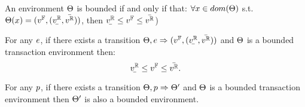 \documentclass[a4paper,11pt]{article}
\begin{document}
\clearpage
\begin{defn}
An environment $\Theta$ is bounded if and only if that:
$\forall x \in dom(\Theta)$ s.t. $\trsenv(x) =(\fval, (\ubar{\rval}, \bar{\rval}))$,
 then 
$\ubar{\rval} \leq \fval \leq \bar{\rval}$) 
\end{defn}
%
%
\begin{thm}
\label{thm:expsound}
For any $e$, if there exists a transition 
$\trsenv, \expr \trsto (\fval, (\ubar{\rval}, \bar{\rval}))$ 
and $\Theta$ is a bounded transaction environment
%
then:
%
$$\ubar{\rval} \leq \fval \leq \bar{\rval}.$$
%
\end{thm}
%
%
%
\begin{thm}
\label{thm:progsound}
For any $p$, if there exists a transition 
$\Theta, p \Rightarrow \Theta'$ and $\Theta$ is a bounded transaction environment 
then 
$\Theta'$ is also a bounded environment.
\end{thm}
%
\end{document}
